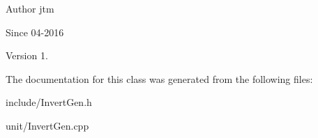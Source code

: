 \begin{DoxyAuthor}{Author}
jtm 
\end{DoxyAuthor}
\begin{DoxySince}{Since}
04-\/2016 
\end{DoxySince}
\begin{DoxyVersion}{Version}
1. 
\end{DoxyVersion}


The documentation for this class was generated from the following files\+:\begin{DoxyCompactItemize}
\item 
include/Invert\+Gen.\+h\item 
unit/Invert\+Gen.\+cpp\end{DoxyCompactItemize}
